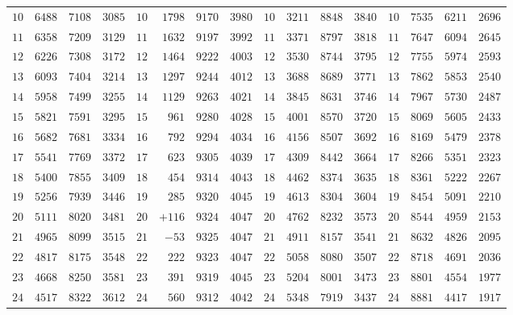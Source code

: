 \begin{center}
{{\begin{minipage}{.96\linewidth}
\begin{tabular}{r|r|r|r||r|r|r|r||r|r|r|r||r|r|r|r}
$10$ & $6488$ & $7108$ & $3085$ & $10$ & $1798$ & $9170$ & $3980$ & $10$ & $3211$ & $8848$ & $3840$ & $10$ & $7535$ & $6211$ & $2696$\\[3pt]
$11$ & $6358$ & $7209$ & $3129$ & $11$ & $1632$ & $9197$ & $3992$ & $11$ & $3371$ & $8797$ & $3818$ & $11$ & $7647$ & $6094$ & $2645$\\
$12$ & $6226$ & $7308$ & $3172$ & $12$ & $1464$ & $9222$ & $4003$ & $12$ & $3530$ & $8744$ & $3795$ & $12$ & $7755$ & $5974$ & $2593$\\
$13$ & $6093$ & $7404$ & $3214$ & $13$ & $1297$ & $9244$ & $4012$ & $13$ & $3688$ & $8689$ & $3771$ & $13$ & $7862$ & $5853$ & $2540$\\
$14$ & $5958$ & $7499$ & $3255$ & $14$ & $1129$ & $9263$ & $4021$ & $14$ & $3845$ & $8631$ & $3746$ & $14$ & $7967$ & $5730$ & $2487$\\
$15$ & $5821$ & $7591$ & $3295$ & $15$ & $961$ & $9280$ & $4028$ & $15$ & $4001$ & $8570$ & $3720$ & $15$ & $8069$ & $5605$ & $2433$\\[3pt]
$16$ & $5682$ & $7681$ & $3334$ & $16$ & $792$ & $9294$ & $4034$ & $16$ & $4156$ & $8507$ & $3692$ & $16$ & $8169$ & $5479$ & $2378$\\
$17$ & $5541$ & $7769$ & $3372$ & $17$ & $623$ & $9305$ & $4039$ & $17$ & $4309$ & $8442$ & $3664$ & $17$ & $8266$ & $5351$ & $2323$\\
$18$ & $5400$ & $7855$ & $3409$ & $18$ & $454$ & $9314$ & $4043$ & $18$ & $4462$ & $8374$ & $3635$ & $18$ & $8361$ & $5222$ & $2267$\\
$19$ & $5256$ & $7939$ & $3446$ & $19$ & $285$ & $9320$ & $4045$ & $19$ & $4613$ & $8304$ & $3604$ & $19$ & $8454$ & $5091$ & $2210$\\
$20$ & $5111$ & $8020$ & $3481$ & $20$ & $+116$ & $9324$ & $4047$ & $20$ & $4762$ & $8232$ & $3573$ & $20$ & $8544$ & $4959$ & $2153$\\[3pt]
$21$ & $4965$ & $8099$ & $3515$ & $21$ & $-53$ & $9325$ & $4047$ & $21$ & $4911$ & $8157$ & $3541$ & $21$ & $8632$ & $4826$ & $2095$\\
$22$ & $4817$ & $8175$ & $3548$ & $22$ & $222$ & $9323$ & $4047$ & $22$ & $5058$ & $8080$ & $3507$ & $22$ & $8718$ & $4691$ & $2036$\\
$23$ & $4668$ & $8250$ & $3581$ & $23$ & $391$ & $9319$ & $4045$ & $23$ & $5204$ & $8001$ & $3473$ & $23$ & $8801$ & $4554$ & $1977$\\
$24$ & $4517$ & $8322$ & $3612$ & $24$ & $560$ & $9312$ & $4042$ & $24$ & $5348$ & $7919$ & $3437$ & $24$ & $8881$ & $4417$ & $1917$\\

\end{tabular}
\end{minipage}}}
\end{center}

